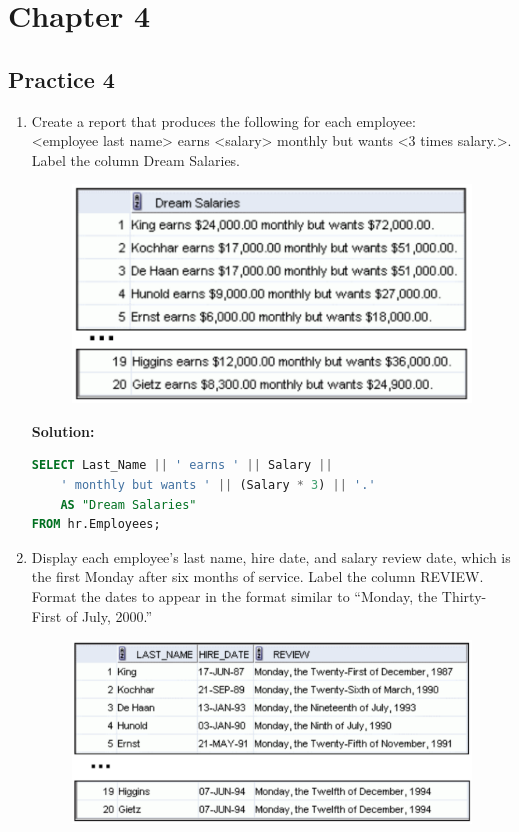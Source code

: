 \documentclass[a4paper,12pt]{article}
\begin{document}


\newpage
\section*{Chapter 4}
\subsection*{Practice 4}
\begin{enumerate}
    \item Create a report that produces the following for each employee: \\
\textless employee last name\textgreater{} earns \textless salary\textgreater{} monthly but wants \textless 3 times
salary.\textgreater{}. Label the column Dream Salaries.

    \begin{figure}[h]
        \centering
            \centering
            \includegraphics[width=.6\linewidth]{graphics/41.png}
    \end{figure}
    
    \textbf{Solution: }
    \begin{lstlisting}[language=SQL]
SELECT Last_Name || ' earns ' || Salary || 
    ' monthly but wants ' || (Salary * 3) || '.' 
    AS "Dream Salaries"
FROM hr.Employees;
    \end{lstlisting}
        \item Display each employee's last name, hire date, and salary review date, which is the first Monday
after six months of service. Label the column REVIEW. Format the dates to appear in the format
similar to “Monday, the Thirty-First of July, 2000.”

    \begin{figure}[h]
        \centering
            \centering
            \includegraphics[width=.6\linewidth]{graphics/42.png}
    \end{figure}
    

\end{enumerate}
\end{document}
